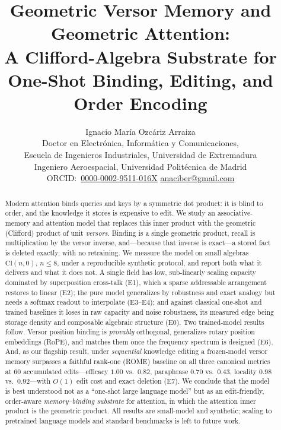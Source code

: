 \documentclass[10pt,twocolumn]{article}
\title{\vspace{-1.2em}\bfseries Geometric Versor Memory and Geometric Attention:\\
A Clifford-Algebra Substrate for One-Shot Binding, Editing, and Order Encoding}
\author{%
Ignacio Mar\'ia Ozc\'ariz Arraiza\\[0.3em]
\small Doctor en Electr\'onica, Inform\'atica y Comunicaciones,\\[-0.3em]
\small Escuela de Ingenieros Industriales, Universidad de Extremadura\\[-0.2em]
\small Ingeniero Aeroespacial, Universidad Polit\'ecnica de Madrid\\[0.35em]
\small ORCID:~\href{https://orcid.org/0000-0002-9511-016X}{0000-0002-9511-016X}
\quad\href{mailto:anaciber@gmail.com}{anaciber@gmail.com}
}
\date{}
\newcommand{\Cl}{\mathrm{Cl}}
\begin{document}
\maketitle

\begin{abstract}
\noindent
Modern attention binds queries and keys by a symmetric dot product: it is blind
to order, and the knowledge it stores is expensive to edit. We study an
associative-memory and attention model that replaces this inner product with the
geometric (Clifford) product of unit \emph{versors}. Binding is a single
geometric product, recall is multiplication by the versor inverse, and---because
that inverse is exact---a stored fact is deleted exactly, with no retraining. We
measure the model on small algebras $\Cl(n,0)$, $n\le 8$, under a reproducible
synthetic protocol, and report both what it delivers and what it does not. A
single field has low, sub-linearly scaling capacity dominated by superposition
cross-talk (E1), which a sparse addressable arrangement restores to linear (E2);
the pure model generalizes by robustness and exact analogy but needs a softmax
readout to interpolate (E3--E4); and against classical one-shot and trained
baselines it loses in raw capacity and noise robustness, its measured edge being
storage density and composable algebraic structure (E0). Two trained-model
results follow. Versor position binding is \emph{provably} orthogonal, generalizes
rotary position embeddings (RoPE), and matches them once the frequency spectrum
is designed (E6). And, as our flagship result, under \emph{sequential} knowledge
editing a frozen-model versor memory surpasses a faithful rank-one (ROME)
baseline on all three canonical metrics at 60 accumulated edits---efficacy
$1.00$ vs.\ $0.82$, paraphrase $0.70$ vs.\ $0.43$, locality $0.98$ vs.\
$0.92$---with $O(1)$ edit cost and exact deletion (E7). We conclude that the
model is best understood not as a ``one-shot large language model'' but as an
edit-friendly, order-aware \emph{memory--binding substrate} for attention, in
which the attention inner product is the geometric product. All results are
small-model and synthetic; scaling to pretrained language models and standard
benchmarks is left to future work.
\end{abstract}
\end{document}
